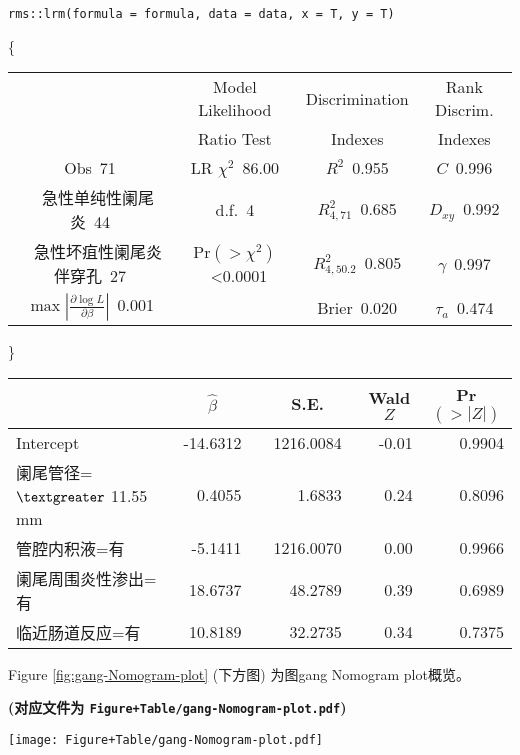 \documentclass[
]{article}
\begin{document}
\begin{verbatim}
rms::lrm(formula = formula, data = data, x = T, y = T)
\end{verbatim}

\{\selectfont 

\begin{center}\begin{tabular}{|c|c|c|c|}\hline
&Model Likelihood&Discrimination&Rank Discrim.\\
&Ratio Test&Indexes&Indexes\\\hline
Obs~\hfill 71&LR $\chi^{2}$~\hfill 86.00&$R^{2}$~\hfill 0.955&$C$~\hfill 0.996\\
~~急性单纯性阑尾炎~\hfill 44&d.f.~\hfill 4&$R^{2}_{4,71}$~\hfill 0.685&$D_{xy}$~\hfill 0.992\\
~~急性坏疽性阑尾炎伴穿孔~\hfill 27&Pr$(>\chi^{2})$~\hfill \textless 0.0001&$R^{2}_{4,50.2}$~\hfill 0.805&$\gamma$~\hfill 0.997\\
$\max|\frac{\partial\log L}{\partial \beta}|$~\hfill 0.001&&Brier~\hfill 0.020&$\tau_{a}$~\hfill 0.474\\
\hline
\end{tabular}
\end{center}

\}

\setlongtables

\begin{longtable}{lrrrr}\hline
\multicolumn{1}{l}{}&\multicolumn{1}{c}{$\hat{\beta}$}&\multicolumn{1}{c}{S.E.}&\multicolumn{1}{c}{Wald $Z$}&\multicolumn{1}{c}{Pr$(>|Z|)$}\tabularnewline
\hline
\endhead
\hline
\endfoot
Intercept&~-14.6312~&~1216.0084~&-0.01&0.9904\tabularnewline
阑尾管径=$\textgreater $ 11.55 mm&~  0.4055~&~   1.6833~& 0.24&0.8096\tabularnewline
管腔内积液=有&~ -5.1411~&~1216.0070~& 0.00&0.9966\tabularnewline
阑尾周围炎性渗出=有&~ 18.6737~&~  48.2789~& 0.39&0.6989\tabularnewline
临近肠道反应=有&~ 10.8189~&~  32.2735~& 0.34&0.7375\tabularnewline
\hline
\end{longtable}
\addtocounter{table}{-1}

Figure \ref{fig:gang-Nomogram-plot} (下方图) 为图gang Nomogram plot概览。

\textbf{(对应文件为 \texttt{Figure+Table/gang-Nomogram-plot.pdf})}

\def\@captype{figure}
\begin{center}
\texttt{[image: Figure+Table/gang-Nomogram-plot.pdf]}
\caption{Gang Nomogram plot}\label{fig:gang-Nomogram-plot}
\end{center}
\end{document}
